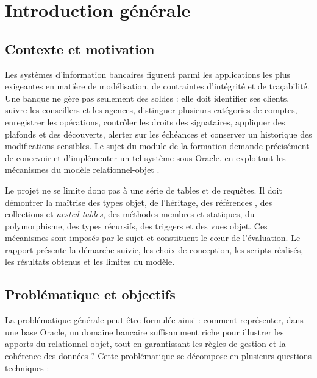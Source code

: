 \chapter{Introduction générale}
\label{chap:introduction}

\section{Contexte et motivation}

Les systèmes d'information bancaires figurent parmi les applications les plus
exigeantes en matière de modélisation, de contraintes d'intégrité et de
traçabilité. Une banque ne gère pas seulement des soldes : elle doit identifier
ses clients, suivre les conseillers et les agences, distinguer plusieurs
catégories de comptes, enregistrer les opérations, contrôler les droits des
signataires, appliquer des plafonds et des découverts, alerter sur les
échéances et conserver un historique des modifications sensibles. Le sujet du
module \module{} de la formation \formation{} demande précisément de concevoir
et d'implémenter un tel système sous Oracle, en exploitant les mécanismes du
modèle relationnel-objet \cite{sujetBDDA}.

Le projet ne se limite donc pas à une série de tables et de requêtes. Il doit
démontrer la maîtrise des types objet, de l'héritage, des références
, des collections  et \emph{nested tables}, des méthodes
membres et statiques, du polymorphisme, des types récursifs, des triggers et
des vues objet. Ces mécanismes sont imposés par le sujet et constituent le
cœur de l'évaluation. Le rapport présente la démarche suivie, les choix de
conception, les scripts réalisés, les résultats obtenus et les limites du
modèle.

\section{Problématique et objectifs}

La problématique générale peut être formulée ainsi : comment représenter, dans
une base Oracle, un domaine bancaire suffisamment riche pour illustrer les
apports du relationnel-objet, tout en garantissant les règles de gestion et la
cohérence des données ? Cette problématique se décompose en plusieurs
questions techniques :

